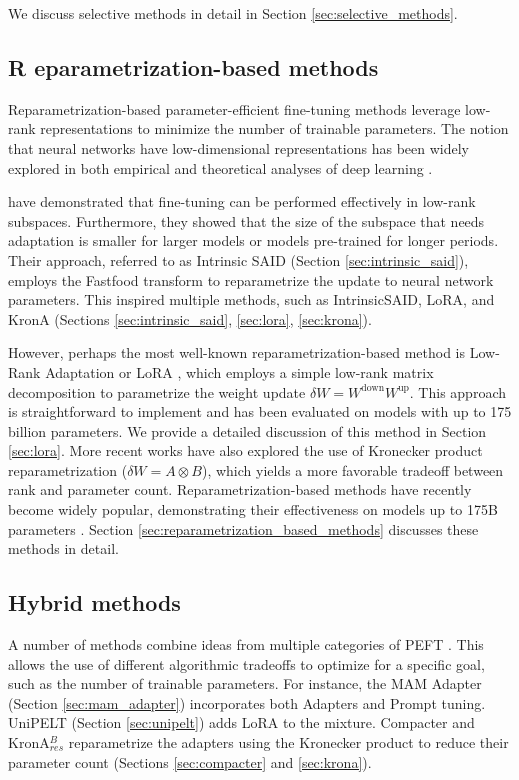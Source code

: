 We discuss selective methods in detail in Section \ref{sec:selective_methods}.

\subsection{\textcolor{r_color}{R} eparametrization-based methods} Reparametrization-based parameter-efficient fine-tuning methods leverage low-rank representations to minimize the number of trainable parameters. The notion that neural networks have low-dimensional representations has been widely explored in both empirical and theoretical analyses of deep learning \citep{parametercounting,measuring_the_intrinsic_dimension,Arora2018StrongerGB,malladi2022kernel}.

\citet{intrinsic_said} have demonstrated that fine-tuning can be performed effectively in low-rank subspaces. Furthermore, they showed that the size of the subspace that needs adaptation is smaller for larger models or models pre-trained for longer periods. Their approach, referred to as Intrinsic SAID (Section \ref{sec:intrinsic_said}), employs the Fastfood transform \citep{Le2013FastfoodAK} to reparametrize the update to neural network parameters. This inspired multiple methods, such as IntrinsicSAID, LoRA, and KronA (Sections \ref{sec:intrinsic_said}, \ref{sec:lora}, \ref{sec:krona}).

However, perhaps the most well-known reparametrization-based method is Low-Rank Adaptation or LoRA \citep{lora}, which employs a simple low-rank matrix decomposition to parametrize the weight update $\delta W = W^{\text{down}}W^{\text{up}}$. This approach is straightforward to implement and has been evaluated on models with up to 175 billion parameters. We provide a detailed discussion of this method in Section \ref{sec:lora}. More recent works \citep{compacter,krona} have also explored the use of Kronecker product reparametrization ($\delta W = A \otimes B$), which yields a more favorable tradeoff between rank and parameter count. Reparametrization-based methods have recently become widely popular, demonstrating their effectiveness on models up to 175B parameters \citep{lora}. Section \ref{sec:reparametrization_based_methods} discusses these methods in detail.

\subsection{Hybrid methods}
\label{sec:hybrid}
A number of methods combine ideas from multiple categories of PEFT \citep{parallel_adapter,sparse_adapter,unipelt,compacter}. This allows the use of different algorithmic tradeoffs to optimize for a specific goal, such as the number of trainable parameters. For instance, the MAM Adapter (Section \ref{sec:mam_adapter}) incorporates both Adapters and Prompt tuning. UniPELT (Section \ref{sec:unipelt}) adds LoRA to the mixture. Compacter and KronA$^B_{res}$ reparametrize the adapters using the Kronecker product to reduce their parameter count (Sections \ref{sec:compacter} and \ref{sec:krona}).

